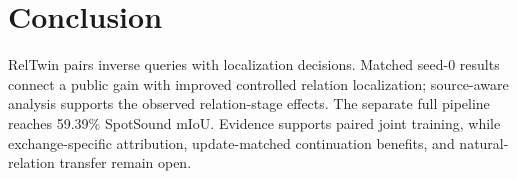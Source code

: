 \section{Conclusion}
RelTwin pairs inverse queries with localization decisions. Matched seed-0 results connect a public gain with improved controlled relation localization; source-aware analysis supports the observed relation-stage effects. The separate full pipeline reaches 59.39\% SpotSound mIoU. Evidence supports paired joint training, while exchange-specific attribution, update-matched continuation benefits, and natural-relation transfer remain open.
